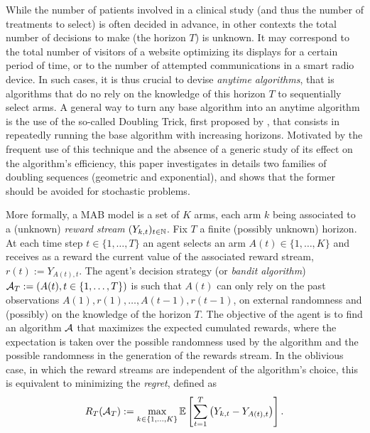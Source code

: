 \documentclass[12pt]{colt2018} %
\begin{document}
While the number of patients involved in a clinical study (and thus the number of treatments to select) is often decided in advance, in other contexts the total number of decisions to make (the horizon $T$) is unknown.
It may correspond to the total number of visitors of a website optimizing its displays for a certain period of time, or to the number of attempted communications in a smart radio device.
In such cases, it is thus crucial to devise \emph{anytime algorithms}, that is algorithms that do no rely on the knowledge of this horizon $T$ to sequentially select arms.
A general way to turn any base algorithm into an anytime algorithm is the use of the so-called Doubling Trick, first proposed by \cite{auer1995gambling}, that consists in repeatedly running the base algorithm with increasing horizons.
Motivated by the frequent use of this technique and the absence of a generic study of its effect on the algorithm's efficiency,
this paper investigates in details two families of doubling sequences (geometric and exponential), and shows that the former should be avoided for stochastic problems.


More formally, a MAB model is a set of $K$ arms, each arm $k$ being associated to a (unknown) \emph{reward stream} $(Y_{k,t})_{t\in\mathbb{N}}$.
Fix $T$ a finite (possibly unknown) horizon.
At each time step $t \in \{1,\dots,T\}$ an agent selects an arm $A(t) \in \{1,\dots,K\}$ and receives as a reward the current value of the associated reward stream, $r(t) := Y_{A(t), t}$.
The agent's decision strategy (or \emph{bandit algorithm})
$\mathcal{A}_T := (A(t), t\in \{1,\dots,T\})$ is such that $A(t)$ can only rely on the past observations
$A(1),r(1),\dots,A(t-1),r(t-1)$,
on external randomness and (possibly) on the knowledge of the horizon $T$.
The objective of the agent is to find an algorithm $\mathcal{A}$ that maximizes the expected cumulated rewards, where the expectation is taken over the possible randomness used by the algorithm and the possible randomness in the generation of the rewards stream.
In the oblivious case, in which the reward streams are independent of the algorithm's choice, this is equivalent to minimizing the \emph{regret}, defined as
\begin{equation}\label{eq:regret}
    R_T(\mathcal{A}_T) := \max_{k \in \{1,\dots,K\}}
    \mathbb{E}\left[\sum_{t=1}^{T} \left(Y_{k,t} - Y_{A(t),t}\right)\right].
\end{equation}
\end{document}
